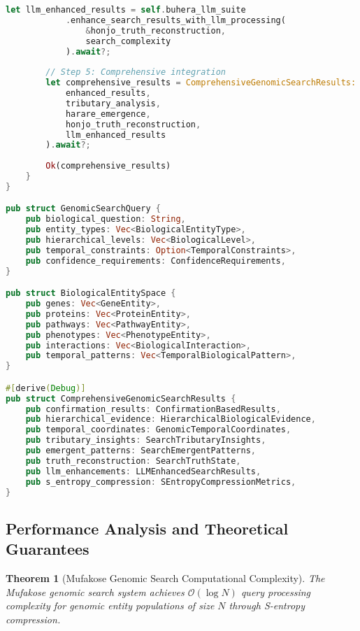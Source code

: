 \documentclass[12pt,a4paper]{article}
\newtheorem{theorem}{Theorem}[section]
\begin{document}
\begin{lstlisting}[language=Rust, caption=Integrated Mufakose-Gospel Genomic Search System]
        let llm_enhanced_results = self.buhera_llm_suite
            .enhance_search_results_with_llm_processing(
                &honjo_truth_reconstruction,
                search_complexity
            ).await?;
        
        // Step 5: Comprehensive integration
        let comprehensive_results = ComprehensiveGenomicSearchResults::integrate(
            enhanced_results,
            tributary_analysis,
            harare_emergence,
            honjo_truth_reconstruction,
            llm_enhanced_results
        ).await?;
        
        Ok(comprehensive_results)
    }
}

pub struct GenomicSearchQuery {
    pub biological_question: String,
    pub entity_types: Vec<BiologicalEntityType>,
    pub hierarchical_levels: Vec<BiologicalLevel>,
    pub temporal_constraints: Option<TemporalConstraints>,
    pub confidence_requirements: ConfidenceRequirements,
}

pub struct BiologicalEntitySpace {
    pub genes: Vec<GeneEntity>,
    pub proteins: Vec<ProteinEntity>,
    pub pathways: Vec<PathwayEntity>,
    pub phenotypes: Vec<PhenotypeEntity>,
    pub interactions: Vec<BiologicalInteraction>,
    pub temporal_patterns: Vec<TemporalBiologicalPattern>,
}

#[derive(Debug)]
pub struct ComprehensiveGenomicSearchResults {
    pub confirmation_results: ConfirmationBasedResults,
    pub hierarchical_evidence: HierarchicalBiologicalEvidence,
    pub temporal_coordinates: GenomicTemporalCoordinates,
    pub tributary_insights: SearchTributaryInsights,
    pub emergent_patterns: SearchEmergentPatterns,
    pub truth_reconstruction: SearchTruthState,
    pub llm_enhancements: LLMEnhancedSearchResults,
    pub s_entropy_compression: SEntropyCompressionMetrics,
}
\end{lstlisting}

\subsection{Performance Analysis and Theoretical Guarantees}

\begin{theorem}[Mufakose Genomic Search Computational Complexity]
The Mufakose genomic search system achieves $\mathcal{O}(\log N)$ query processing complexity for genomic entity populations of size $N$ through S-entropy compression.
\end{theorem}
\end{document}
